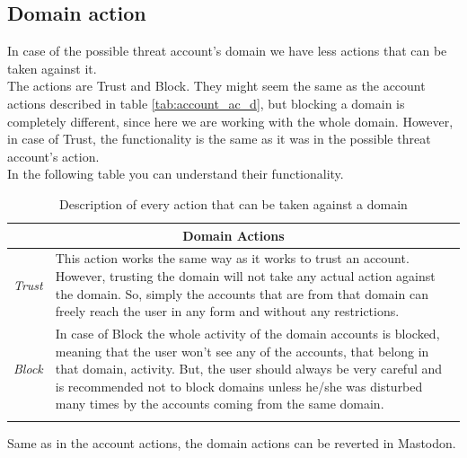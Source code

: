 \subsection{Domain action}\label{ss:dmn_action}
In case of the possible threat account's domain we have less actions that can be taken against it. 
\\[5pt]
The actions are Trust and Block. They might seem the same as the account actions described in table \ref{tab:account_ac_d}, but blocking a domain is completely different, since here we are working with the whole domain. However, in case of Trust, the functionality is the same as it was in the possible threat account's action.
\\[5pt]
In the following table you can understand their functionality.
\begin{center}
	\begin{longtable}{ | p{} | p{} | }
		
		\hline
		\multicolumn{2}{|c|}{\textbf{Domain Actions}}
		\\ \hline
		
		
		\hline
		\endfirsthead %
		
		\hline
		\hline
		\endhead %
		
		\hline
		\endfoot %
		
		\endlastfoot %
		
		\emph{Trust}
		& This action works the same way as it works to trust an account. However, trusting the domain will not take any actual action against the domain. So, simply the accounts that are from that domain can freely reach the user in any form and without any restrictions.
		\\ \hline
		
		\emph{Block}
		& In case of Block the whole activity of the domain accounts is blocked, meaning that the user won't see any of the accounts, that belong in that domain, activity. But, the user should always be very careful and is recommended not to block domains unless he/she was disturbed many times by the accounts coming from the same domain.
		\\ \hline

		\caption{Description of every action that can be taken against a domain}
		\label{tab:account_do_d}		
	\end{longtable}
\end{center}
Same as in the account actions, the domain actions can be reverted in Mastodon.
